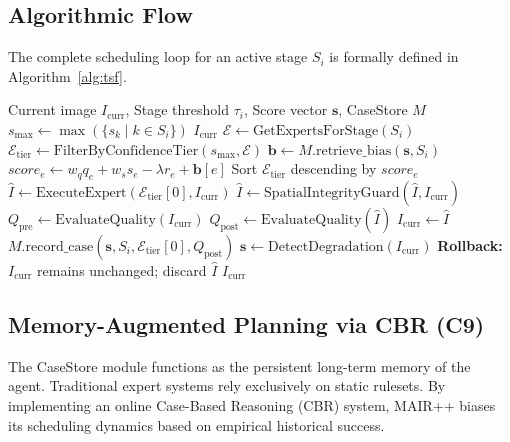 \documentclass[journal, 10pt]{IEEEtran}
\begin{document}
\subsection{Algorithmic Flow}
The complete scheduling loop for an active stage $S_i$ is formally defined in Algorithm~\ref{alg:tsf}.

\begin{algorithm}[h]
\caption{MAIR++ Stage Execution and Quality Gating}
\label{alg:tsf}
\begin{algorithmic}[1]
\REQUIRE Current image $I_{\text{curr}}$, Stage threshold $\tau_i$, Score vector $\mathbf{s}$, CaseStore $M$
\STATE $s_{\max} \leftarrow \max(\{s_k \mid k \in S_i\})$
    \RETURN $I_{\text{curr}}$ 
\ENDIF
\STATE $\mathcal{E} \leftarrow \text{GetExpertsForStage}(S_i)$
\STATE $\mathcal{E}_{\text{tier}} \leftarrow \text{FilterByConfidenceTier}(s_{\max}, \mathcal{E})$ 
\STATE $\mathbf{b} \leftarrow M.\text{retrieve\_bias}(\mathbf{s}, S_i)$ 
    \STATE $score_e \leftarrow w_q q_e + w_s s_e - \lambda r_e + \mathbf{b}[e]$ 
\ENDFOR
\STATE Sort $\mathcal{E}_{\text{tier}}$ descending by $score_e$
\STATE $\hat{I} \leftarrow \text{ExecuteExpert}(\mathcal{E}_{\text{tier}}[0], I_{\text{curr}})$
\STATE $\hat{I} \leftarrow \text{SpatialIntegrityGuard}(\hat{I}, I_{\text{curr}})$ 
\STATE $Q_{\text{pre}} \leftarrow \text{EvaluateQuality}(I_{\text{curr}})$
\STATE $Q_{\text{post}} \leftarrow \text{EvaluateQuality}(\hat{I})$
 
    \STATE $I_{\text{curr}} \leftarrow \hat{I}$
    \STATE $M.\text{record\_case}(\mathbf{s}, S_i, \mathcal{E}_{\text{tier}}[0], Q_{\text{post}})$ 
    \STATE $\mathbf{s} \leftarrow \text{DetectDegradation}(I_{\text{curr}})$ 
\ELSE
    \STATE \textbf{Rollback:} $I_{\text{curr}}$ remains unchanged; discard $\hat{I}$
\ENDIF
\RETURN $I_{\text{curr}}$
\end{algorithmic}
\end{algorithm}

\subsection{Memory-Augmented Planning via CBR (C9)}
The CaseStore module functions as the persistent long-term memory of the agent. Traditional expert systems rely exclusively on static rulesets. By implementing an online Case-Based Reasoning (CBR) system, MAIR++ biases its scheduling dynamics based on empirical historical success.
\end{document}
